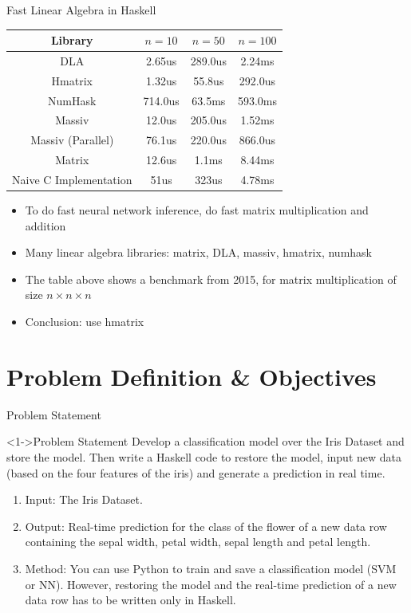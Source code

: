 \documentclass{beamer}
\begin{document}
\begin{frame}{Fast Linear Algebra in Haskell}
  \begin{table}\label{tab:1}
    \centering \begin{tabular}{|c|c|c|c|}
      \hline \textbf{Library} & $n = 10$ & $n = 50$ & $n = 100$\\
      \hline DLA & 2.65us & 289.0us & 2.24ms\\
      \hline Hmatrix & 1.32us & 55.8us & 292.0us\\
      \hline NumHask & 714.0us & 63.5ms & 593.0ms\\
      \hline Massiv & 12.0us & 205.0us & 1.52ms\\
      \hline Massiv (Parallel) & 76.1us & 220.0us & 866.0us\\
      \hline Matrix & 12.6us & 1.1ms & 8.44ms\\
      \hline Naive C Implementation & 51us & 323us & 4.78ms\\
      \hline
    \end{tabular}
  \end{table}  
  \begin{itemize}
    \item To do fast neural network inference, do fast matrix multiplication and addition
    \item Many linear algebra libraries: matrix, DLA, massiv, hmatrix, numhask
    \item The table above shows a benchmark from 2015, for matrix multiplication of size $n\times n\times n$
    \item<2-> Conclusion: use hmatrix
  \end{itemize}
\end{frame}

\section{Problem Definition \& Objectives}

\begin{frame}{Problem Statement}
  \begin{block}<1->{Problem Statement}
    Develop a classification model over the Iris Dataset and store the model. Then write a Haskell code to restore the model, input new data (based on the four features of the iris) and generate a prediction in real time.
    \begin{enumerate}
      \item<2-> Input: The Iris Dataset.
      \item<2-> Output: Real-time prediction for the class of the flower of a new data row containing the sepal width, petal width, sepal length and petal length.
      \item<3-> Method: You can use Python to train and save a classification model (SVM or NN). However, restoring the model and the real-time prediction of a new data row has to be written only in Haskell.
    \end{enumerate}
  \end{block}
\end{frame}
\end{document}
